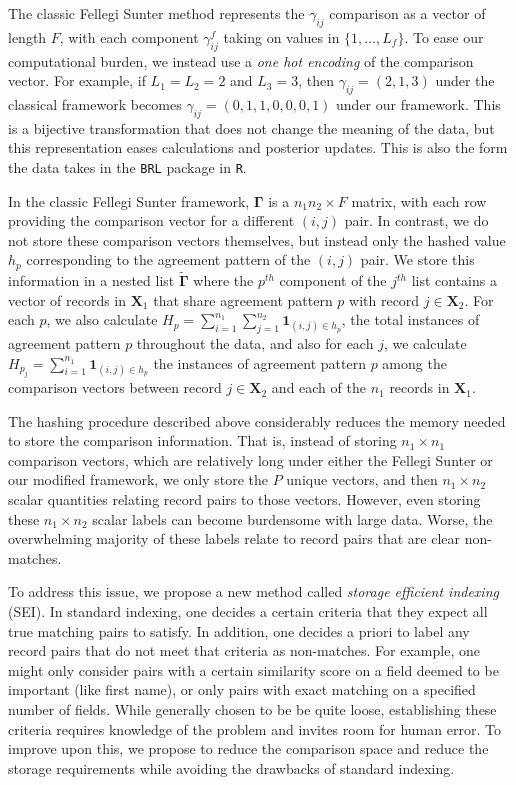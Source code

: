 \documentclass[12pt,letterpaper]{article}
\newcommand{\1}[1]{\mathbb{I}\!\left[#1\right]} %
\begin{document}
The classic Fellegi Sunter method represents the \(\gamma_{ij}\)
comparison as a vector of length \(F\), with each component
\(\gamma_{ij}^f\) taking on values in \(\{1, \ldots, L_f \}\). 
To ease our computational burden, we instead use a \emph{one hot encoding} of the comparison vector. For example, if
\(L_1 = L_2 = 2\) and \(L_3 = 3\), then \(\gamma_{ij} = (2, 1, 3)\)
under the classical framework becomes
\(\gamma_{ij} = (0, 1, 1, 0, 0, 0, 1)\) under our framework. This is a
bijective transformation that does not change the meaning of the data,
but this representation eases calculations and posterior updates. This is also the form the data takes in the \texttt{BRL} package in \texttt{R}. 

In the classic Fellegi Sunter framework, $\bm{\Gamma}$ is a
\(n_1 n_2 \times F\) matrix, with each row providing the comparison
vector for a different \((i,j)\) pair. In contrast, we do not store
these comparison vectors themselves, but instead only the hashed value $h_p$
corresponding to the agreement pattern of the \((i, j)\) pair. We store
this information in a nested list $\tilde{\bm{\Gamma}}$ where the
\(p^{th}\) component of the \(j^{th}\) list contains a vector of records
in \(\bm{X}_1\) that share agreement pattern \(p\) with record \(j \in \bm{X}_2\). For
each \(p\), we also calculate
\(H_p = \sum_{i=1}^{n_1}\sum_{j=1}^{n_2} \mathbf{1}_{(i,j) \in h_p}\),
the total instances of agreement pattern \(p\) throughout the data, and
also for each \(j\), we calculate
\(H_{p_j} = \sum_{i=1}^{n_1} \mathbf{1}_{{(i,j) \in h_p}}\) the
instances of agreement pattern \(p\) among the comparison vectors
between record \(j \in \bm{X}_2\) and each of the \(n_1\) records in \(\bm{X}_1\).

The hashing procedure described above considerably reduces the memory
needed to store the comparison information. That is, instead of storing
\(n_1 \times n_1\) comparison vectors, which are relatively long under
either the Fellegi Sunter or our modified framework, we only store the
\(P\) unique vectors, and then \(n_1 \times n_2\) scalar quantities
relating record pairs to those vectors. However, even storing these
\(n_1 \times n_2\) scalar labels can become burdensome with large data.
Worse, the overwhelming majority of these labels relate to record pairs
that are clear non-matches.

To address this issue, we propose a new method called \emph{storage	efficient indexing} (SEI). In standard indexing, one decides a certain criteria that they expect all true matching pairs to satisfy. In addition, one decides 
a priori to label any record pairs that do not meet that criteria as
non-matches. For example, one might only consider pairs with a certain
similarity score on a field deemed to be important (like first name), or
only pairs with exact matching on a specified number of fields. While
generally chosen to be be quite loose, establishing these criteria
requires knowledge of the problem and invites room for human error. 
To improve upon this, we propose to reduce the comparison space and reduce the storage requirements while avoiding the drawbacks of standard indexing. 
\end{document}
